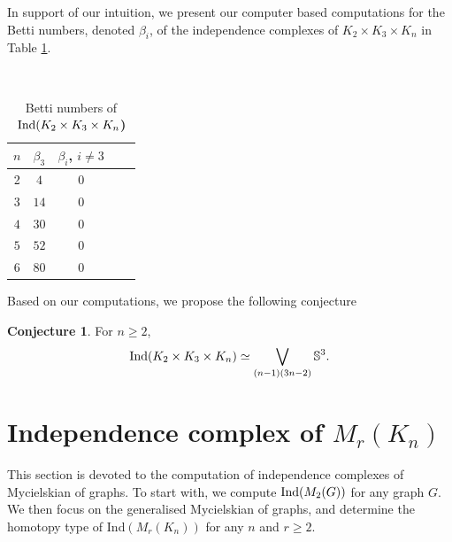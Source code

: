 \documentclass[12pt]{article}
\numberwithin{thm}{section}
\theoremstyle{definition}
\newtheorem{conj}{Conjecture}
\newcommand{\ind}{{\rm{Ind}}}
\begin{document}
\noindent \begin{minipage}[m]{.35\textwidth}
    {In support of our intuition, we present  our computer based computations for the Betti numbers, denoted $\beta_i$, of the independence complexes of $K_2 \times K_3 \times K_n$ in Table \ref{table:3}.}
\end{minipage}
\begin{minipage}[m]{0.05\textwidth}
{ ~}
\end{minipage}
\begin{minipage}[m]{.6\textwidth}
{\begin{table}[H]
	\centering
	\begin{tabular}{ |c|c|c|c|c| }
		\hline 
		{\bf $n$}  & {\bf $\beta_3$} & {\bf $\beta_i$, $i \neq 3$} \\ 
		\hline \hline
		2& $4$ & $0$ \\ 
		\hline
		3& $14$ & $0$ \\ 
		\hline
		$4$ & $30$ &  $0$ \\ 
		\hline
		$5$ &  $52$&  $0$\\ 
		\hline
			$6$ & $80$ &  $0$\\ 
		\hline
	\end{tabular}
	\caption{Betti numbers of  {\bf $\ind(K_2 \times K_3 \times K_n$)}}
	\label{table:3}
\end{table}}
\end{minipage}

\pagebreak
Based on our computations, we propose the following conjecture 

\begin{conj} For $n \geq 2$, $$\ind(K_2 \times K_3 \times K_n)\simeq \bigvee\limits_{(n-1)(3n-2)} \mathbb{S}^3.$$
	\end{conj}

  \section{Independence complex of \texorpdfstring{$M_r(K_n)$}{}}\label{sec:mycielskian}
 
 This section is devoted to the computation of independence complexes of Mycielskian of graphs. To start with, we compute  $\ind(M_2(G))$ for any graph $G$. We then focus on the generalised Mycielskian of graphs, and determine the homotopy type of \ind$(M_r(K_n))$ for any $n$ and $r\ge 2$.
 
\end{document}
